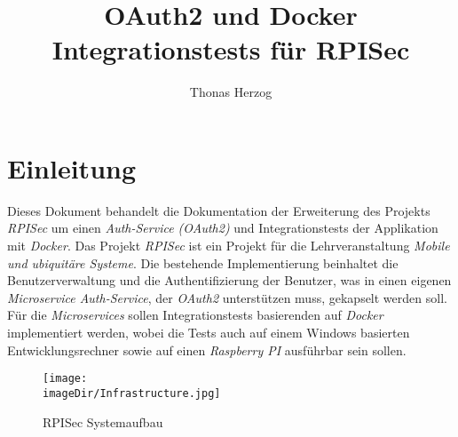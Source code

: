 \documentclass[]{article}
\title{OAuth2 und Docker Integrationstests für RPISec}
\author{Thonas Herzog}
\newcommand{\imageDir}{../../images}
\begin{document}
\maketitle

\section{Einleitung}
Dieses Dokument behandelt die Dokumentation der Erweiterung des Projekts \emph{RPISec} um einen \emph{Auth-Service (OAuth2)} und Integrationstests der Applikation mit \emph{Docker}. Das Projekt \emph{RPISec} ist ein Projekt für die Lehrveranstaltung \emph{Mobile und ubiquitäre Systeme}. 
\newline
\newline
Die bestehende Implementierung beinhaltet die Benutzerverwaltung und die Authentifizierung der Benutzer, was in einen eigenen \emph{Microservice Auth-Service}, der \emph{OAuth2} unterstützen muss, gekapselt werden soll. Für die \emph{Microservices} sollen Integrationstests basierenden auf \emph{Docker} implementiert werden, wobei die Tests auch auf einem Windows basierten Entwicklungsrechner sowie auf einen \emph{Raspberry PI} ausführbar sein sollen. 
\begin{figure}[h]
	\centering
	\texttt{[image: \\imageDir/Infrastructure.jpg]}
	\caption{RPISec Systemaufbau}
	\label{fig:image-rpisec-system-structure}
\end{figure}
\ \newpage
\end{document}
